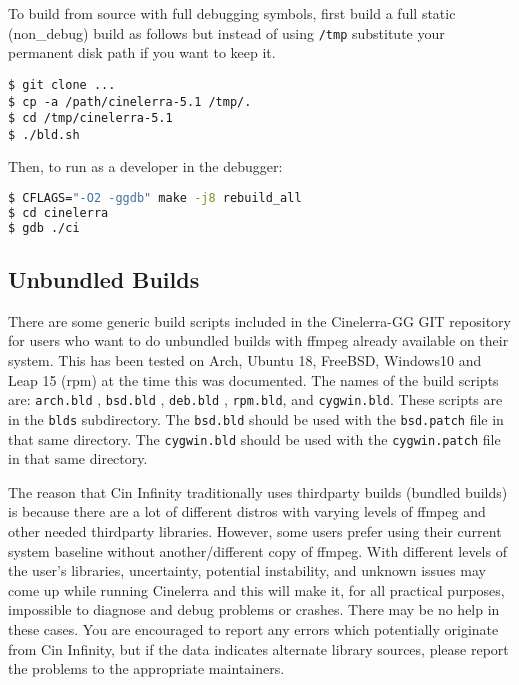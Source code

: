 To build from source with full debugging symbols, first build a full static (non\_debug) build as follows but instead of using \texttt{/tmp} substitute your permanent disk path if you want to keep it.

\begin{lstlisting}[numbers=none]
$ git clone ...
$ cp -a /path/cinelerra-5.1 /tmp/.
$ cd /tmp/cinelerra-5.1
$ ./bld.sh
\end{lstlisting}


Then, to run as a developer in the debugger:

\begin{lstlisting}[language=bash,numbers=none]
$ CFLAGS="-O2 -ggdb" make -j8 rebuild_all
$ cd cinelerra
$ gdb ./ci
\end{lstlisting}


\subsection{Unbundled Builds}%
\label{sub:unbundled_builds}

There are some generic build scripts included in the Cinelerra-GG GIT repository for users who want to do unbundled builds with ffmpeg already available on their system.  
This has been tested on Arch, Ubuntu 18, FreeBSD, Windows10 and Leap 15 (rpm) at the time this was documented.  
The names of the build scripts are:  \texttt{arch.bld} ,  \texttt{bsd.bld} , \texttt{deb.bld} , \texttt{rpm.bld}, and \texttt{cygwin.bld}.  
These scripts are in the \texttt{blds} subdirectory.  
The \texttt{bsd.bld} should be used with the \texttt{bsd.patch} file in that same directory.
The \texttt{cygwin.bld} should be used with the \texttt{cygwin.patch} file in that same directory.

The reason that Cin Infinity traditionally uses thirdparty builds (bundled builds) is because there are a lot of different distros with varying levels of ffmpeg and other needed thirdparty libraries.  
However, some users prefer using their current system baseline without another/different copy of ffmpeg.  
With different levels of the user’s libraries, uncertainty, potential instability, and unknown issues may come up while running Cinelerra and this will make it, for all practical purposes, impossible to diagnose and debug problems or crashes.  
There may be no help in these cases.  You are encouraged to report any errors which potentially originate from Cin Infinity, but if the data indicates alternate library sources, please report the problems to the appropriate maintainers.

